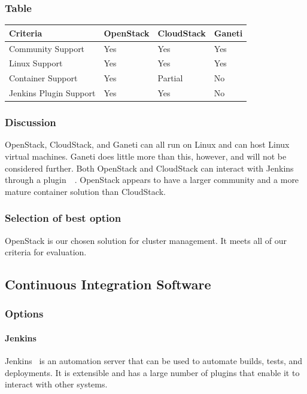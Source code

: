 \documentclass[10pt,letterpaper,onecolumn,draftclsnofoot]{IEEEtran}
\begin{document}
\subsubsection{Table}
\begin{center}
  \begin{tabular}{llll}
    Criteria & OpenStack & CloudStack & Ganeti \\ \midrule
    Community Support       & Yes & Yes & Yes \\ \midrule
    Linux Support           & Yes & Yes & Yes \\ \midrule
    Container Support       & Yes & Partial & No \\ \midrule
    Jenkins Plugin Support  & Yes & Yes & No \\ \bottomrule
  \end{tabular}
\end{center}
\subsubsection{Discussion}
OpenStack, CloudStack, and Ganeti can all run on Linux and can host Linux virtual machines.
Ganeti does little more than this, however, and will not be considered further.
Both OpenStack and CloudStack can interact with Jenkins through a plugin~\cite{jcloudsplugin}~\cite{jcloudsproviders}.
OpenStack appears to have a larger community and a more mature container solution than CloudStack.
\subsubsection{Selection of best option}
OpenStack is our chosen solution for cluster management. It meets all of our criteria for evaluation.

\subsection{Continuous Integration Software}
\subsubsection{Options}
\paragraph{Jenkins}
Jenkins~\cite{jenkinsmain} is an automation server that can be used to automate builds, tests, and deployments.
It is extensible and has a large number of plugins that enable it to interact with other systems. 
\end{document}

